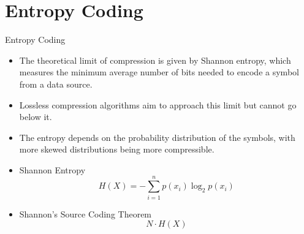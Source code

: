 \section{Entropy Coding}
\begin{frame}[fragile]{Entropy Coding}
    \begin{itemize}
        \item The theoretical limit of compression is given by Shannon entropy, which measures the minimum average number of bits needed to encode a symbol from a data source.
        \item Lossless compression algorithms aim to approach this limit but cannot go below it.
        \item The entropy depends on the probability distribution of the symbols, with more skewed distributions being more compressible.
        \item Shannon Entropy  $$H(X) = -\sum_{i=1}^{n} p(x_i) \log_2 p(x_i)$$ 
        \item Shannon's Source Coding Theorem  $$N \cdot H(X)$$
    \end{itemize}
\end{frame}